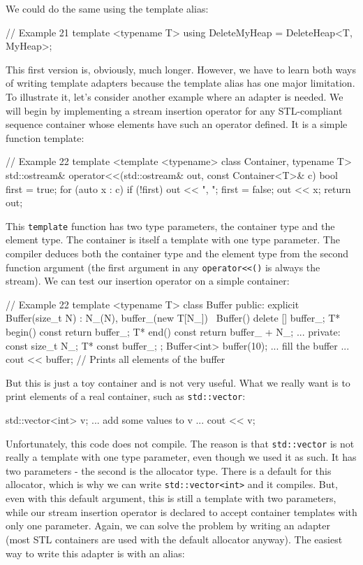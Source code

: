 We could do the same using the template alias:

\begin{code}
// Example 21
template <typename T>
using DeleteMyHeap = DeleteHeap<T, MyHeap>;
\end{code}

This first version is, obviously, much longer. However, we have to learn both ways of writing template adapters because the template alias has one major limitation. To illustrate it, let's consider another example where an adapter is needed. We will begin by implementing a stream insertion operator for any STL-compliant sequence container whose elements have such an operator defined. It is a simple function template:

\begin{code}
// Example 22
template <template <typename> class Container, typename T>
std::ostream& operator<<(std::ostream& out,
                         const Container<T>& c) {
  bool first = true;
  for (auto x : c) {
  if (!first) out << ", ";
    first = false;
    out << x;
  }
  return out;
}
\end{code}

This \texttt{template} function has two type parameters, the container type and the element type. The container is itself a template with one type parameter. The compiler deduces both the container type and the element type from the second function argument (the first argument in any \texttt{operator\textless{}\textless{}()} is always the stream). We can test our insertion operator on a simple container:

\begin{code}
// Example 22
template <typename T> class Buffer {
  public:
  explicit Buffer(size_t N) : N_(N), buffer_(new T[N_]) {}
  ~Buffer() { delete [] buffer_; }
  T* begin() const { return buffer_; }
  T* end() const { return buffer_ + N_; }
  ...
  private:
  const size_t N_;
  T* const buffer_;
};
Buffer<int> buffer(10);
... fill the buffer ...
cout << buffer; // Prints all elements of the buffer
\end{code}

But this is just a toy container and is not very useful. What we really want is to print elements of a real container, such as \texttt{std::vector}:

\begin{code}
std::vector<int> v;
... add some values to v ...
cout << v;
\end{code}

Unfortunately, this code does not compile. The reason is that \texttt{std::vector} is not really a template with one type parameter, even though we used it as such. It has two parameters - the second is the allocator type. There is a default for this allocator, which is why we can write \texttt{std::vector\textless{}int\textgreater{}} and it compiles. But, even with this default argument, this is still a template with two parameters, while our stream insertion operator is declared to accept container templates with only one parameter. Again, we can solve the problem by writing an adapter (most STL containers are used with the default allocator anyway). The easiest way to write this adapter is with an alias:

